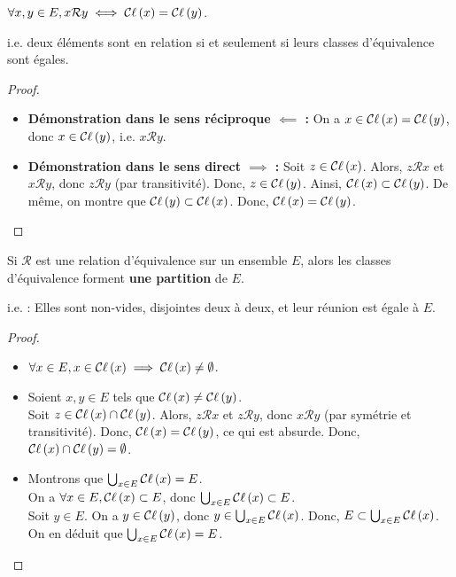 \documentclass[12pt, a4paper]{report}
\begin{document}
\begin{property}
    $\forall x,y \in E, x\mathcal{R}y \iff \mathcal{C}\ell\left(x\right) = \mathcal{C}\ell\left(y\right)$.

    i.e. deux éléments sont en relation si et seulement si leurs classes d'équivalence sont égales.
\end{property}

\begin{proof}
    \begin{itemize}
        \item \textbf{Démonstration dans le sens réciproque $\impliedby$ :} On a $x\in\mathcal{C}\ell\left(x\right) = \mathcal{C}\ell\left(y\right)$, donc $x\in\mathcal{C}\ell\left(y\right)$, i.e. $x\mathcal{R}y$.
        \item \textbf{Démonstration dans le sens direct $\implies$ :} Soit $z \in \mathcal{C}\ell\left(x\right)$. Alors, $z \mathcal{R} x$ et $x \mathcal{R} y$, donc $z \mathcal{R} y$ (par transitivité). Donc, $z \in \mathcal{C}\ell\left(y\right)$. Ainsi, $\mathcal{C}\ell\left(x\right) \subset \mathcal{C}\ell\left(y\right)$. De même, on montre que $\mathcal{C}\ell\left(y\right) \subset \mathcal{C}\ell\left(x\right)$. Donc, $\mathcal{C}\ell\left(x\right) = \mathcal{C}\ell\left(y\right)$.
    \end{itemize}
\end{proof}

\begin{property}
    Si $\mathcal{R}$ est une relation d'équivalence sur un ensemble $E$, alors les classes d'équivalence forment \textbf{une partition} de $E$.
    
    i.e. : Elles sont non-vides, disjointes deux à deux, et leur réunion est égale à $E$.
\end{property}

\begin{proof}
    \begin{itemize}
        \item $\forall x \in E, x\in \mathcal{C}\ell\left(x\right) \implies \mathcal{C}\ell\left(x\right) \ne \emptyset$.
        \item Soient $x,y \in E$ tels que $\mathcal{C}\ell\left(x\right) \ne \mathcal{C}\ell\left(y\right)$.\\Soit $z \in \mathcal{C}\ell\left(x\right) \cap \mathcal{C}\ell\left(y\right)$. Alors, $z \mathcal{R} x$ et $z \mathcal{R} y$, donc $x \mathcal{R} y$ (par symétrie et transitivité). Donc, $\mathcal{C}\ell\left(x\right) = \mathcal{C}\ell\left(y\right)$, ce qui est absurde. Donc, $\mathcal{C}\ell\left(x\right) \cap \mathcal{C}\ell\left(y\right) = \emptyset$.
        \item Montrons que $\bigcup_{x \in E} \mathcal{C}\ell\left(x\right) = E$.\\On a $\forall x \in E, \mathcal{C}\ell\left(x\right) \subset E$, donc $\bigcup_{x \in E} \mathcal{C}\ell\left(x\right) \subset E$.\\Soit $y \in E$. On a $y \in \mathcal{C}\ell\left(y\right)$, donc $y \in \bigcup_{x \in E} \mathcal{C}\ell\left(x\right)$. Donc, $E \subset \bigcup_{x \in E} \mathcal{C}\ell\left(x\right)$.\\On en déduit que $\bigcup_{x \in E} \mathcal{C}\ell\left(x\right) = E$.
    \end{itemize}
\end{proof}
\end{document}

